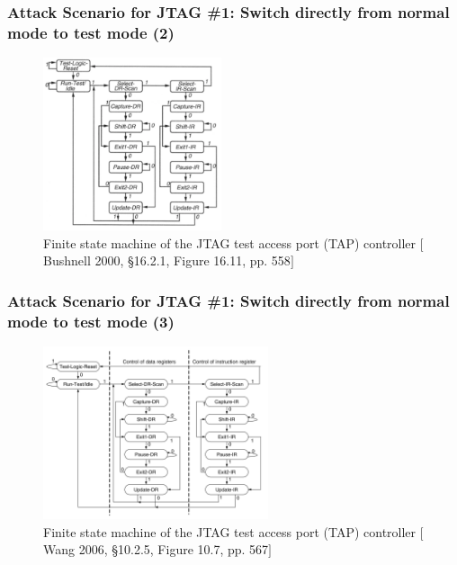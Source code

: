 \documentclass[xcolor={usenames,dvipsnames},hyperref={hyperindex,bookmarks}]{beamer}
\begin{document}
\frame
{
	\frametitle{Attack Scenario for JTAG \#1: Switch directly from normal mode to test mode (2)}

\begin{figure}[h]
\centering 
\includegraphics[height=2.0in]{./pics/jtag_tap_controller_Bushnell2000}
\caption{Finite state machine of the JTAG test access port (TAP) controller $[$Bushnell 2000, \S16.2.1, Figure 16.11, pp. 558$]$}
\label{fig:JTAGTAPcontrollerBushnell2000}
\end{figure}
}

\frame
{
	\frametitle{Attack Scenario for JTAG \#1: Switch directly from normal mode to test mode (3)}

\begin{figure}[h]
\centering 
\includegraphics[height=2.0in]{./pics/jtag_tap_controller_Wang2006b}
\caption{Finite state machine of the JTAG test access port (TAP) controller $[$Wang 2006, \S10.2.5, Figure 10.7, pp. 567$]$}
\label{fig:JTAGTAPcontrollerWang2006b}
\end{figure}
}

\end{document}
